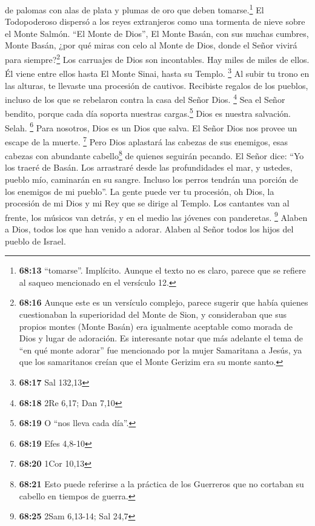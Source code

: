 de palomas con alas de plata y plumas de oro que deben
tomarse.\footnote{\textbf{68:13} ``tomarse''. Implícito. Aunque el texto
  no es claro, parece que se refiere al saqueo mencionado en el
  versículo 12.}  El Todopoderoso dispersó a los reyes
extranjeros como una tormenta de nieve sobre el Monte Salmón.
 ``El Monte de Dios'', El Monte Basán, con sus muchas
cumbres, Monte Basán,  ¿por qué miras con celo al Monte
de Dios, donde el Señor vivirá para siempre?\footnote{\textbf{68:16}
  Aunque este es un versículo complejo, parece sugerir que había quienes
  cuestionaban la superioridad del Monte de Sion, y consideraban que sus
  propios montes (Monte Basán) era igualmente aceptable como morada de
  Dios y lugar de adoración. Es interesante notar que más adelante el
  tema de ``en qué monte adorar'' fue mencionado por la mujer Samaritana
  a Jesús, ya que los samaritanos creían que el Monte Gerizim era su
  monte santo.}  Los carruajes de Dios son incontables.
Hay miles de miles de ellos. Él viene entre ellos hasta El Monte Sinai,
hasta su Templo. \footnote{\textbf{68:17} Sal 132,13}  Al
subir tu trono en las alturas, te llevaste una procesión de cautivos.
Recibiste regalos de los pueblos, incluso de los que se rebelaron contra
la casa del Señor Dios. \footnote{\textbf{68:18} 2Re 6,17; Dan 7,10}
 Sea el Señor bendito, porque cada día soporta nuestras
cargas.\footnote{\textbf{68:19} O ``nos lleva cada día''.} Dios es
nuestra salvación. Selah. \footnote{\textbf{68:19} Efes 4,8-10}
 Para nosotros, Dios es un Dios que salva. El Señor Dios
nos provee un escape de la muerte. \footnote{\textbf{68:20} 1Cor 10,13}
 Pero Dios aplastará las cabezas de sus enemigos, esas
cabezas con abundante cabello\footnote{\textbf{68:21} Esto puede
  referirse a la práctica de los Guerreros que no cortaban su cabello en
  tiempos de guerra.} de quienes seguirán pecando.  El
Señor dice: ``Yo los traeré de Basán. Los arrastraré desde las
profundidades el mar,  y ustedes, pueblo mío, caminarán
en su sangre. Incluso los perros tendrán una porción de los enemigos de
mi pueblo''.  La gente puede ver tu procesión, oh Dios,
la procesión de mi Dios y mi Rey que se dirige al Templo.
 Los cantantes van al frente, los músicos van detrás, y
en el medio las jóvenes con panderetas. \footnote{\textbf{68:25} 2Sam
  6,13-14; Sal 24,7}  Alaben a Dios, todos los que han
venido a adorar. Alaben al Señor todos los hijos del pueblo de Israel.
